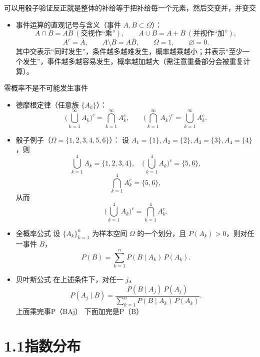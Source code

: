 \begin{dxtips}
    可以用骰子验证反正就是整体的补给等于把补给每一个元素，然后交变并，并变交
\end{dxtips}
\begin{itemize}
  \item 事件运算的直观记号与含义（事件 $A,B\subset\Omega$）：
  \[
  A\cap B=AB\ (\text{交视作“乘”}),\qquad
  A\cup B=A+B\ (\text{并视作“加”}),
  \]
  \[
  A^c=\overline A,\qquad
  A\setminus B=A\overline B,\qquad
  \Omega=1,\qquad
  \varnothing=0.
  \]
  其中交表示“同时发生”，条件越多越难发生，概率越乘越小；并表示“至少一个发生”，事件越多越容易发生，概率越加越大（需注意重叠部分会被重复计算）。
\end{itemize}
零概率不是不可能发生事件
\begin{itemize}
  \item 德摩根定律（任意族 $\{A_k\}$）：
  \[
  \Big(\bigcup_{k=1}^\infty A_k\Big)^c=\bigcap_{k=1}^\infty A_k^c,
  \qquad
  \Big(\bigcap_{k=1}^\infty A_k\Big)^c=\bigcup_{k=1}^\infty A_k^c.
  \]

  \item 骰子例子（$\Omega=\{1,2,3,4,5,6\}$）：
  设 $A_1=\{1\},A_2=\{2\},A_3=\{3\},A_4=\{4\}$，则
  \[
  \bigcup_{k=1}^4 A_k=\{1,2,3,4\},\quad
  \Big(\bigcup_{k=1}^4 A_k\Big)^c=\{5,6\},
  \]
  \[
  \bigcap_{k=1}^4 A_k^c=\{5,6\},
  \]
  从而
  \[
  \Big(\bigcup_{k=1}^4 A_k\Big)^c=\bigcap_{k=1}^4 A_k^c.
  \]
\end{itemize}
\begin{itemize}
  \item 全概率公式  
  设 $\{A_k\}_{k=1}^n$ 为样本空间 $\Omega$ 的一个划分，且 $P(A_k)>0$，则对任一事件 $B$，
  \[
  P(B)=\sum_{k=1}^n P(B\mid A_k)\,P(A_k).
  \]

  \item 贝叶斯公式  
  在上述条件下，对任一 $j$，
  \[
  P(A_j\mid B)=\frac{P(B\mid A_j)\,P(A_j)}
  {\sum_{k=1}^n P(B\mid A_k)\,P(A_k)}.
  \]
  上面乘完事P（BAj）
  下面加完是P（B）
\end{itemize}
\section*{1.1指数分布}

